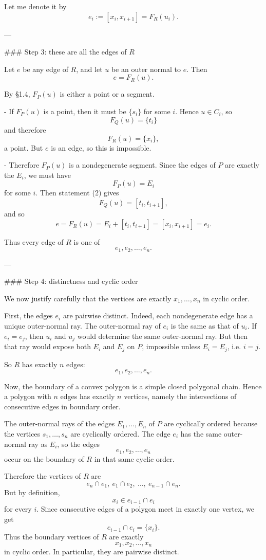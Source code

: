 Let me denote it by
\[
e_i:=[x_i,x_{i+1}]=F_R(u_i).
\]

---

### Step 3: these are all the edges of \(R\)

Let \(e\) be any edge of \(R\), and let \(u\) be an outer normal to \(e\). Then
\[
e=F_R(u).
\]

By §1.4, \(F_P(u)\) is either a point or a segment.

- If \(F_P(u)\) is a point, then it must be \(\{s_i\}\) for some \(i\). Hence \(u\in C_i\), so
  \[
  F_Q(u)=\{t_i\}
  \]
  and therefore
  \[
  F_R(u)=\{x_i\},
  \]
  a point. But \(e\) is an edge, so this is impossible.

- Therefore \(F_P(u)\) is a nondegenerate segment. Since the edges of \(P\) are exactly the \(E_i\), we must have
  \[
  F_P(u)=E_i
  \]
  for some \(i\). Then statement (2) gives
  \[
  F_Q(u)=[t_i,t_{i+1}],
  \]
  and so
  \[
  e=F_R(u)=E_i+[t_i,t_{i+1}]=[x_i,x_{i+1}]=e_i.
  \]

Thus every edge of \(R\) is one of
\[
e_1,e_2,\dots,e_n.
\]

---

### Step 4: distinctness and cyclic order

We now justify carefully that the vertices are exactly \(x_1,\dots,x_n\) in cyclic order.

First, the edges \(e_i\) are pairwise distinct. Indeed, each nondegenerate edge has a unique outer-normal ray. The outer-normal ray of \(e_i\) is the same as that of \(u_i\). If \(e_i=e_j\), then \(u_i\) and \(u_j\) would determine the same outer-normal ray. But then that ray would expose both \(E_i\) and \(E_j\) on \(P\), impossible unless \(E_i=E_j\), i.e. \(i=j\).

So \(R\) has exactly \(n\) edges:
\[
e_1,e_2,\dots,e_n.
\]

Now, the boundary of a convex polygon is a simple closed polygonal chain. Hence a polygon with \(n\) edges has exactly \(n\) vertices, namely the intersections of consecutive edges in boundary order.

The outer-normal rays of the edges \(E_1,\dots,E_n\) of \(P\) are cyclically ordered because the vertices \(s_1,\dots,s_n\) are cyclically ordered. The edge \(e_i\) has the same outer-normal ray as \(E_i\), so the edges
\[
e_1,e_2,\dots,e_n
\]
occur on the boundary of \(R\) in that same cyclic order.

Therefore the vertices of \(R\) are
\[
e_n\cap e_1,\ e_1\cap e_2,\ \dots,\ e_{n-1}\cap e_n.
\]
But by definition,
\[
x_i\in e_{i-1}\cap e_i
\]
for every \(i\). Since consecutive edges of a polygon meet in exactly one vertex, we get
\[
e_{i-1}\cap e_i=\{x_i\}.
\]
Thus the boundary vertices of \(R\) are exactly
\[
x_1,x_2,\dots,x_n
\]
in cyclic order. In particular, they are pairwise distinct.


